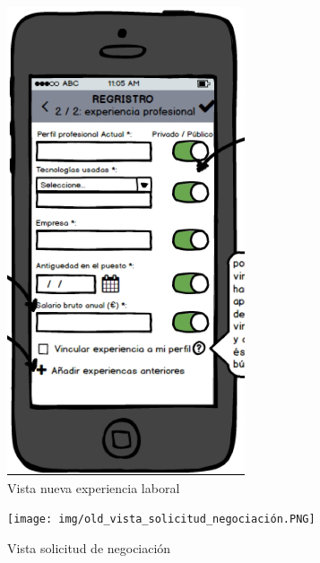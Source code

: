 \documentclass[a4paper, 12pt]{book}
\begin{document}
    \begin{figure}
        \centering
        \includegraphics[width=7cm, keepaspectratio]{img/old_vista_nueva_experiencia_laboral.PNG}
        \caption{Vista nueva experiencia laboral}
    \end{figure}

    \begin{figure}
        \centering
        \texttt{[image: img/old\_vista\_solicitud\_negociación.PNG]}
        \caption{Vista solicitud de negociación}
    \end{figure}
\end{document}
